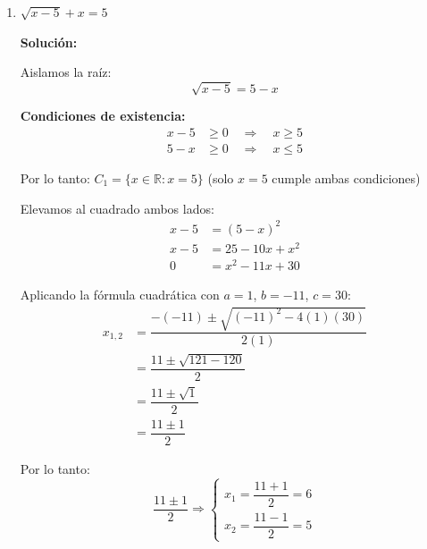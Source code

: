 \documentclass[12pt]{article}
\newcommand{\solucion}{%
    \vspace{0.8em}%
    \textbf{Solución:}%
}
\begin{document}
\begin{enumerate}[label=\alph*.-]
    \textbf{Intersección con las condiciones de existencia:}

    Debemos verificar cuáles valores pertenecen a $C_1 = \{-1 \leq x \leq 4\}$:
    \begin{itemize}
        \item $x_1 = \dfrac{21}{4} \approx 5{,}25 > 4$ \quad $\Rightarrow$ No pertenece a $C_1$
        \item $x_2 = 3$ cumple $-1 \leq 3 \leq 4$ \checkmark \ \ Pertenece a $C_1$
    \end{itemize}
    
    \[
    \boxed{CS = \{3\}}
    \]

    \item $\sqrt{x-5} + x = 5$

    \solucion

    Aislamos la raíz:
    \[
    \sqrt{x-5} = 5 - x
    \]

    \textbf{Condiciones de existencia:}
    \begin{align*}
    x - 5 &\geq 0 \quad \Rightarrow \quad x \geq 5 \\
    5 - x &\geq 0 \quad \Rightarrow \quad x \leq 5
    \end{align*}

    Por lo tanto: $C_1 = \{x \in \mathbb{R} : x = 5\}$ (solo $x = 5$ cumple ambas condiciones)

    Elevamos al cuadrado ambos lados:
    \begin{align*}
    x - 5 &= (5 - x)^2 \\[0.3em]
    x - 5 &= 25 - 10x + x^2 \\[0.3em]
    0 &= x^2 - 11x + 30
    \end{align*}

    Aplicando la fórmula cuadrática con $a = 1$, $b = -11$, $c = 30$:
    \begin{align*}
    x_{1,2} &= \dfrac{-(-11) \pm \sqrt{(-11)^2 - 4(1)(30)}}{2(1)} \\[0.3em]
    &= \dfrac{11 \pm \sqrt{121 - 120}}{2} \\[0.3em]
    &= \dfrac{11 \pm \sqrt{1}}{2} \\[0.3em]
    &= \dfrac{11 \pm 1}{2}
    \end{align*}

    Por lo tanto:
    \[
    \dfrac{11 \pm 1}{2} \Rightarrow \begin{cases} x_1 = \dfrac{11 + 1}{2} = 6 \\ x_2 = \dfrac{11 - 1}{2} = 5 \end{cases}
    \]


\end{enumerate}
\end{document}
